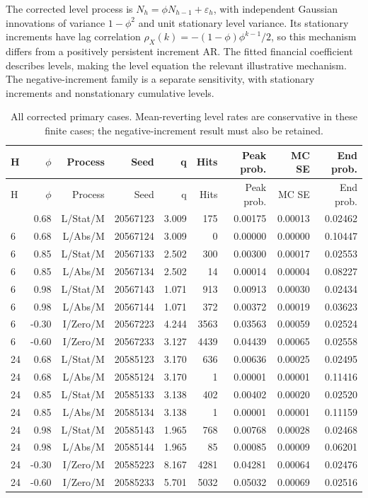\documentclass[11pt,a4paper]{article}
\begin{document}
The corrected level process is
\(N_h=\phi N_{h-1}+\varepsilon_h\), with independent Gaussian innovations
of variance \(1-\phi^2\) and unit stationary level variance. Its stationary
increments have lag correlation
\(\rho_X(k)=-(1-\phi)\phi^{k-1}/2\), so this mechanism differs from a
positively persistent increment AR. The fitted financial coefficient describes
levels, making the level equation the relevant illustrative mechanism.
The negative-increment family is a separate sensitivity, with stationary
increments and nonstationary cumulative levels.
\begingroup
\scriptsize
\setlength{\tabcolsep}{3pt}
\renewcommand{\arraystretch}{1.12}
\begin{longtable}{lrrrrrrrr}
\caption{All corrected primary cases. Mean-reverting level rates are conservative in these finite cases; the negative-increment result must also be retained.}\\
\toprule
H & \(\phi\) & Process & Seed & q & Hits & Peak prob. & MC SE & End prob. \\
\midrule
\endfirsthead
\toprule
H & \(\phi\) & Process & Seed & q & Hits & Peak prob. & MC SE & End prob. \\
\midrule
\endhead
\bottomrule
\endfoot
6 & 0.68 & L/Stat/M & 20567123 & 3.009 & 175 & 0.00175 & 0.00013 & 0.02462 \\
6 & 0.68 & L/Abs/M & 20567124 & 3.009 & 0 & 0.00000 & 0.00000 & 0.10447 \\
6 & 0.85 & L/Stat/M & 20567133 & 2.502 & 300 & 0.00300 & 0.00017 & 0.02553 \\
6 & 0.85 & L/Abs/M & 20567134 & 2.502 & 14 & 0.00014 & 0.00004 & 0.08227 \\
6 & 0.98 & L/Stat/M & 20567143 & 1.071 & 913 & 0.00913 & 0.00030 & 0.02434 \\
6 & 0.98 & L/Abs/M & 20567144 & 1.071 & 372 & 0.00372 & 0.00019 & 0.03623 \\
6 & -0.30 & I/Zero/M & 20567223 & 4.244 & 3563 & 0.03563 & 0.00059 & 0.02524 \\
6 & -0.60 & I/Zero/M & 20567233 & 3.127 & 4439 & 0.04439 & 0.00065 & 0.02558 \\
24 & 0.68 & L/Stat/M & 20585123 & 3.170 & 636 & 0.00636 & 0.00025 & 0.02495 \\
24 & 0.68 & L/Abs/M & 20585124 & 3.170 & 1 & 0.00001 & 0.00001 & 0.11416 \\
24 & 0.85 & L/Stat/M & 20585133 & 3.138 & 402 & 0.00402 & 0.00020 & 0.02520 \\
24 & 0.85 & L/Abs/M & 20585134 & 3.138 & 1 & 0.00001 & 0.00001 & 0.11159 \\
24 & 0.98 & L/Stat/M & 20585143 & 1.965 & 768 & 0.00768 & 0.00028 & 0.02468 \\
24 & 0.98 & L/Abs/M & 20585144 & 1.965 & 85 & 0.00085 & 0.00009 & 0.06201 \\
24 & -0.30 & I/Zero/M & 20585223 & 8.167 & 4281 & 0.04281 & 0.00064 & 0.02476 \\
24 & -0.60 & I/Zero/M & 20585233 & 5.701 & 5032 & 0.05032 & 0.00069 & 0.02516 \\
\end{longtable}
\endgroup
\end{document}
